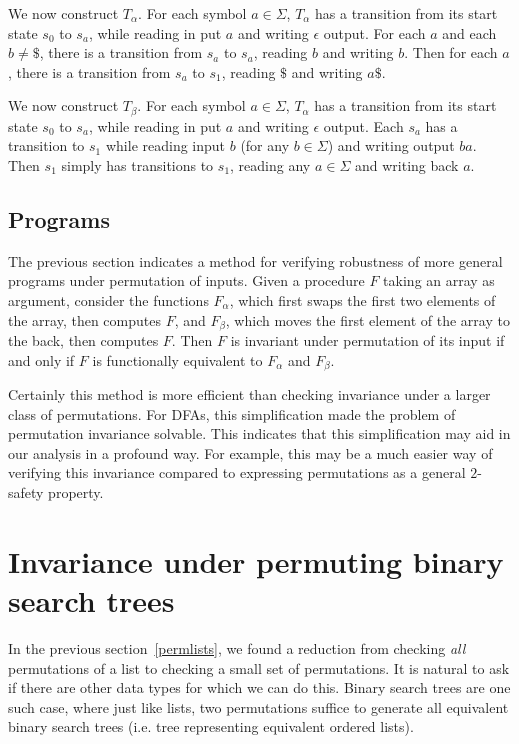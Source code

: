 \documentclass{llncs}
\begin{document}
We now construct $T_\alpha$.
For each symbol $a \in \Sigma$,
$T_\alpha$ has a transition from its start
state $s_0$ to $s_a$, while reading in put $a$ and
writing $\epsilon$ output.
For each $a$ and each $b\ne \$$, there is a
transition from $s_a$ to $s_a$, reading $b$
and writing $b$.
Then for each $a$, there is a transition from
$s_a$ to $s_1$, reading $\$$ and writing $a\$$.

We now construct $T_\beta$.
For each symbol $a \in \Sigma$,
$T_\alpha$ has a transition from its start
state $s_0$ to $s_a$, while reading in put $a$ and
writing $\epsilon$ output.
Each $s_a$ has a transition to $s_1$ while
reading input $b$ (for any $b\in \Sigma$)
and writing output $ba$.
Then $s_1$ simply has transitions to $s_1$,
reading any $a\in \Sigma$ and writing
back $a$.

\subsection{Programs}
The previous section indicates a method for verifying
robustness of more general programs under permutation of inputs.
Given a procedure $F$ taking an array as argument, consider the functions $F_\alpha$, which first swaps the first two elements of the array, then computes $F$, and $F_\beta$, which moves the first element of the array to the back, then computes $F$. Then $F$ is invariant under permutation of its input if and only if $F$ is functionally equivalent to $F_\alpha$ and $F_\beta$.

Certainly this method is more efficient than checking invariance under a larger class of permutations. For DFAs, this simplification made the problem of permutation invariance solvable. This indicates that this simplification may aid in our analysis in a profound way. For example, this may be a much easier way of verifying this invariance compared to expressing permutations as a general $2$-safety property.

\section{Invariance under permuting binary search trees}

In the previous section~\ref{permlists}, we found a reduction
from checking \emph{all} permutations of a list to checking a small set of
permutations. It is natural to ask if there are other data types for which we
can do this. Binary search trees are one such case, where just like lists,
two permutations suffice to generate all equivalent binary search trees
(i.e. tree representing equivalent ordered lists).
\end{document}
